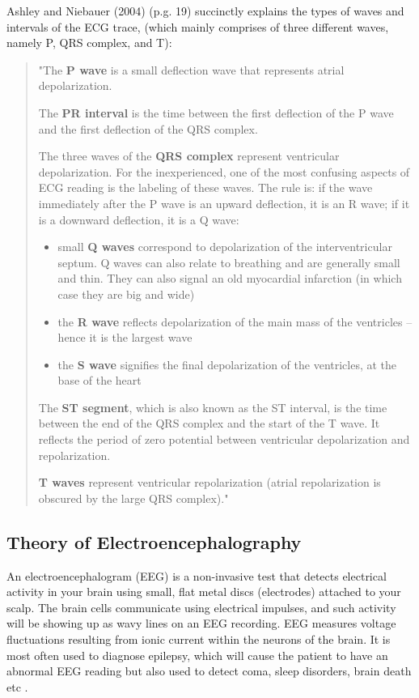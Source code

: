 Ashley and Niebauer (2004) (p.g. 19) \cite{ashley2004conquering} succinctly explains the types of waves and intervals of the ECG trace, (which mainly comprises of three different waves, namely P, QRS complex, and T): 

\blockquote{
"The {\bf P wave} is a small deflection wave that represents atrial depolarization. 

The {\bf PR interval} is the time between the first deflection of the P wave and the first deflection of the QRS complex. 

The three waves of the {\bf QRS complex} represent ventricular depolarization. For the inexperienced, one of the most confusing aspects of ECG reading is the labeling of these waves. The rule is: if the wave immediately after the P wave is an upward deflection, it is an R wave; if it is a downward deflection, it is a Q wave:

\begin{itemize}
	\item small {\bf Q waves} correspond to depolarization of the interventricular septum. Q waves can also relate to breathing and are generally small and thin. They can also signal an old myocardial infarction (in which case they are big and wide)
	\item the {\bf R wave} reflects depolarization of the main mass of the ventricles – hence it is the largest wave
	\item the {\bf S wave} signifies the final depolarization of the ventricles, at the base of the heart 
\end{itemize}

The {\bf ST segment}, which is also known as the ST interval, is the time between the end of the QRS complex and the start of the T wave. It reflects the period of zero potential between ventricular depolarization and repolarization. 

{\bf T waves} represent ventricular repolarization (atrial repolarization is obscured by the large QRS complex)." }


\subsection{Theory of Electroencephalography}

An electroencephalogram (EEG) is a non-invasive test that detects electrical activity in your brain using small, flat metal discs (electrodes) attached to your scalp. The brain cells communicate using electrical impulses, and such activity will be showing up as wavy lines on an EEG recording. EEG measures voltage fluctuations resulting from ionic current within the neurons of the brain. It is most often used to diagnose epilepsy, which will cause the patient to have an abnormal EEG reading but also used to detect coma, sleep disorders, brain death etc \cite{jiahui1}.  

